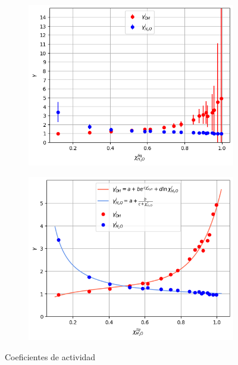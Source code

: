 \documentclass[a4paper,12pt,titlepage]{article}
\begin{document}
\begin{figure}[h!]
    \centering
    \begin{subfigure}{0.49\textwidth}
        \centering
        \includegraphics[width=0.95\linewidth]{ELV binario/coeficientes_inc.png}
    \end{subfigure}
    \begin{subfigure}{0.49\textwidth}
        \centering
        \includegraphics[width=1.05\linewidth]{ELV binario/coeficientes.png}
    \end{subfigure}
    \caption{Coeficientes de actividad}
    \label{fig:enter-label}
\end{figure}
\end{document}
